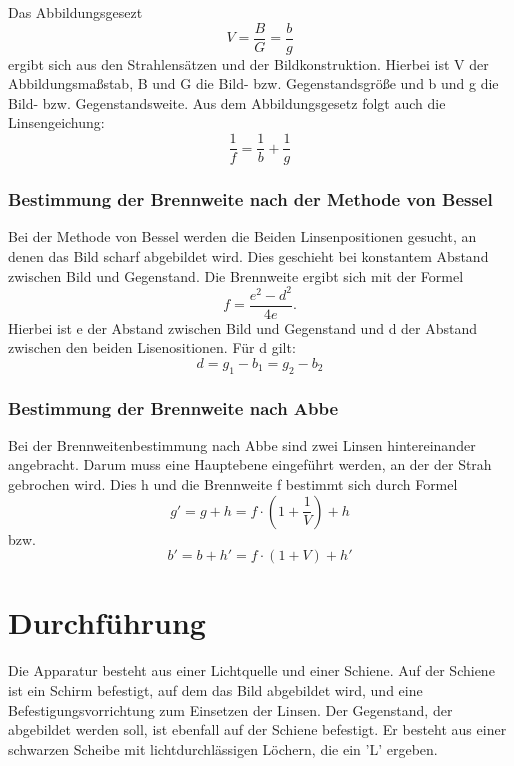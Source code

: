 Das Abbildungsgesezt
\begin{equation}
  V = \frac{B}{G}=\frac{b}{g}
  \label{eqn:abbgesetz}
\end{equation}
ergibt sich aus den Strahlensätzen und der Bildkonstruktion.
Hierbei ist V der Abbildungsmaßstab, B und G die Bild- bzw. Gegenstandsgröße und
b und g die Bild- bzw. Gegenstandsweite.
Aus dem Abbildungsgesetz folgt auch die Linsengeichung:
\begin{equation}
  \frac{1}{f}= \frac{1}{b}+\frac{1}{g}
  \label{eqn:linsgl}
\end{equation}
\subsubsection{Bestimmung der Brennweite nach der Methode von Bessel}
Bei der Methode von Bessel werden die Beiden Linsenpositionen gesucht,
an denen das Bild scharf abgebildet wird.
Dies geschieht bei konstantem Abstand zwischen Bild und Gegenstand.
Die Brennweite ergibt sich mit der Formel
\begin{equation}
  f = \frac{e^2 - d^2}{4e} .
  \label{eqn:fe}
\end{equation}
Hierbei ist e der Abstand zwischen Bild und Gegenstand und d der Abstand zwischen den beiden Lisenositionen.
Für d gilt:
\begin{equation}
  d= g_1-b_1 = g_2-b_2
  \label{eqn:d}
\end{equation}
\subsubsection{Bestimmung der Brennweite nach Abbe }
Bei der Brennweitenbestimmung nach Abbe sind zwei Linsen hintereinander angebracht.
Darum muss eine Hauptebene eingeführt werden, an der der Strah gebrochen wird.
Dies h und die Brennweite f bestimmt sich durch Formel
\begin{equation*}
  g' = g+h = f \cdot \left(1 + \frac{1}{V}\right)+h
\end{equation*}
bzw.
\begin{equation}
  b' = b+h'= f\cdot(1+V) +h'
\end{equation}
\section{Durchführung}

Die Apparatur besteht aus einer Lichtquelle und einer Schiene.
Auf der Schiene ist ein Schirm befestigt, auf dem das Bild abgebildet wird,
und eine Befestigungsvorrichtung zum Einsetzen der Linsen. Der Gegenstand,
der abgebildet werden soll, ist ebenfall auf der Schiene befestigt.
Er besteht aus einer schwarzen Scheibe mit lichtdurchlässigen Löchern, die ein 'L' ergeben.


